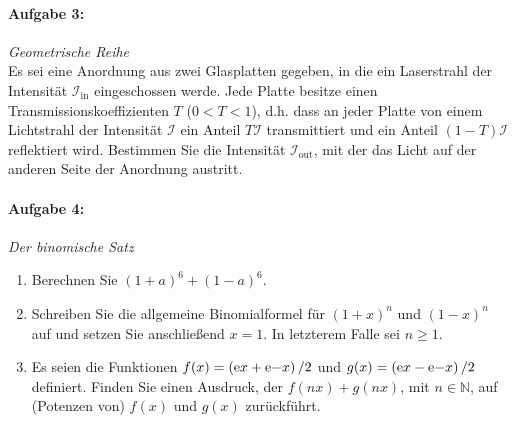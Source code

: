 \paragraph{Aufgabe 3: } \emph{Geometrische Reihe}\\[0.2cm]
Es sei eine Anordnung aus zwei Glasplatten gegeben, in die ein Laserstrahl der Intensität $\mathcal{I}_\text{in}$ eingeschossen werde. Jede Platte besitze einen Transmissionskoeffizienten $T$ ($0<T<1$), d.h. dass an jeder Platte von einem Lichtstrahl der Intensität $\mathcal{I}$ ein Anteil $T \mathcal{I}$ transmittiert und ein Anteil $(1-T)\mathcal{I}$ reflektiert wird.
Bestimmen Sie die Intensität $\mathcal{I}_\text{out}$, mit der das Licht auf der anderen Seite der Anordnung austritt.\\
\begin{center}
    \vspace{-1cm}
\vspace{-2cm}
\end{center}
%
\newpage
\paragraph{Aufgabe 4: } \emph{Der binomische Satz}
\begin{enumerate}[label=(\alph*)]
\item Berechnen Sie $(1+a)^6+(1-a)^6$.
\item Schreiben Sie die allgemeine Binomialformel für $(1+x)^n$ und $(1-x)^n$ auf und setzen Sie anschließend $x=1$. In letzterem Falle sei $n\ge 1$.
\item Es seien die Funktionen $f(x)=\left(\mathrm{e}{x}+\mathrm{e}{-x}\right)/2$ und $g(x)=\left(\mathrm{e}{x}-\mathrm{e}{-x}\right)/2$ definiert. Finden Sie einen Ausdruck, der $f(nx)+g(nx)$, mit $n\in\mathbb{N}$, auf (Potenzen von) $f(x)$ und $g(x)$ zurückführt.
\end{enumerate}
%
